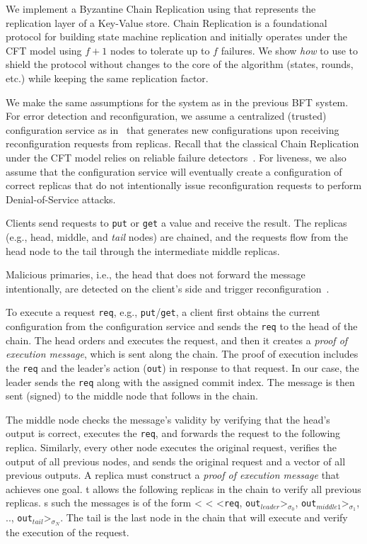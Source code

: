 


We implement a Byzantine Chain Replication using \projecttitle{} that represents the replication layer of a Key-Value store. Chain Replication is a foundational protocol for building state machine replication and initially operates under the CFT model using $f+1$ nodes to tolerate up to $f$ failures. We show {\em how} to use \projecttitle{} to shield the protocol without changes to the core of the algorithm (states, rounds, etc.) while keeping the same replication factor.




 We make the same assumptions for the system as in the previous BFT system. For error detection and reconfiguration, we assume a centralized (trusted) configuration service as in~\cite{10.1007/978-3-642-35476-2_24} that generates new configurations upon receiving reconfiguration requests from replicas. Recall that the classical Chain Replication under the CFT model relies on reliable failure detectors~\cite{chain-replication}. For liveness, we also assume that the configuration service will eventually create a configuration of correct replicas that do not intentionally issue reconfiguration requests to perform Denial-of-Service attacks. 

Clients send requests to {\tt put} or {\tt get} a value and receive the result. The replicas (e.g., head, middle, and {\em tail} nodes) are chained, and the requests flow from the head node to the tail through the intermediate middle replicas. 

Malicious primaries, i.e., the head that does not forward the message intentionally, are detected on the client's side and trigger reconfiguration~\cite{Castro:2002, minBFT}.


 To execute a request \texttt{req}, e.g., {\tt put}/{\tt get}, a client first obtains the current configuration from the configuration service and sends the {\tt req} to the head of the chain. The head orders and executes the request, and then it creates a {\em proof of execution message}, which is sent along the chain. The proof of execution includes the {\tt req} and the leader's action ({\tt out}) in response to that request. In our case, the leader sends the {\tt req} along with the assigned commit index. The message is then sent (signed) to the middle node that follows in the chain.

The middle node checks the message's validity by verifying that the head's output is correct, executes the {\tt req}, and forwards the request to the following replica. Similarly, every other node executes the original request, verifies the output of all previous nodes, and sends the original request and a vector of all previous outputs. A replica must construct a {\em proof of execution message} that achieves one goal. t allows the following replicas in the chain to verify all previous replicas. s such the messages is of the form < < <{\tt req}, {\tt out$_{leader}$}>$_{\sigma_0}$, {\tt out$_{middle1}$}>$_{\sigma_1}$, .., {\tt out$_{tail}$}>$_{\sigma_N}$. The tail is the last node in the chain that will execute and verify the execution of the request. 


